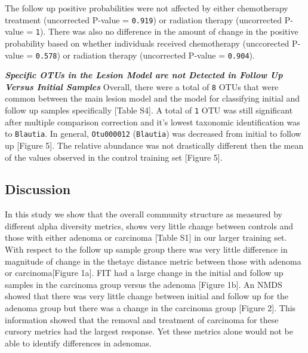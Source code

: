 \documentclass[12pt,]{article}
\begin{document}
The follow up positive probabilities were not affected by either
chemotherapy treatment (uncorrected P-value = \texttt{0.919}) or
radiation therapy (uncorrected P-value = \texttt{1}). There was also no
difference in the amount of change in the positive probability based on
whether individuals received chemotherapy (unccorected P-value =
\texttt{0.578}) or radiation therapy (uncorrected P-value =
\texttt{0.904}).

\textbf{\emph{Specific OTUs in the Lesion Model are not Detected in
Follow Up Versus Initial Samples}} Overall, there were a total of
\texttt{8} OTUs that were common between the main lesion model and the
model for classifying initial and follow up samples specifically
{[}Table S4{]}. A total of \texttt{1} OTU was still significant after
multiple comparison correction and it's lowest taxonomic identification
was to \texttt{Blautia}. In general, \texttt{Otu000012}
(\texttt{Blautia}) was decreased from initial to follow up {[}Figure
5{]}. The relative abundance was not drastically different then the mean
of the values observed in the control training set {[}Figure 5{]}.

\newpage

\subsection{Discussion}\label{discussion}

In this study we show that the overall community structure as measured
by different alpha diversity metrics, shows very little change between
controls and those with either adenoma or carcinoma {[}Table S1{]} in
our larger training set. With respect to the follow up sample group
there was very little difference in magnitude of change in the thetayc
distance metric between those with adenoma or carcinoma{[}Figure 1a{]}.
FIT had a large change in the initial and follow up samples in the
carcinoma group versus the adenoma {[}Figure 1b{]}. An NMDS showed that
there was very little change between initial and follow up for the
adenoma group but there was a change in the carcinoma group {[}Figure
2{]}. This information showed that the removal and treatment of
carcinoma for these cursory metrics had the largest response. Yet these
metrics alone would not be able to identify differences in adenomas.
\end{document}
